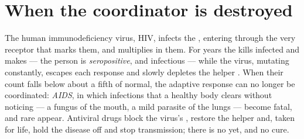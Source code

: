 \section{When the coordinator is destroyed}

\begin{proposition}\label{prop:g12:adaptive-immunity:hiv}
The human immunodeficiency virus, HIV, infects the ,
entering through the very receptor that marks them, and multiplies
in them. For years the  kills infected  and makes
 --- the person is \emph{seropositive}, and infectious ---
while the virus, mutating constantly, escapes each response and slowly
depletes the helper . When their count falls below about a fifth
of normal, the adaptive response can no longer be coordinated:
\emph{AIDS}, in which infections that a healthy body
clears without noticing --- a fungus of the mouth, a mild parasite of
the lungs --- become fatal, and rare  appear. Antiviral drugs
block the virus's , restore the helper  and, taken for
life, hold the disease off and stop transmission; there is no 
yet, and no cure.
\end{proposition}
\admitted

